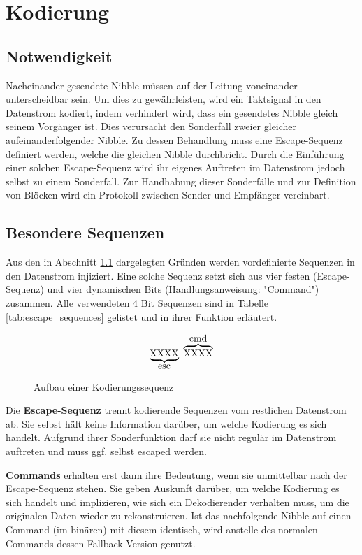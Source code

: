 \chapter{Kodierung}
\section{Notwendigkeit}
\label{sec:notwendigkeit}
Nacheinander gesendete Nibble müssen auf der Leitung voneinander unterscheidbar sein. Um dies zu gewährleisten, wird ein Taktsignal in den Datenstrom kodiert, indem verhindert wird, dass ein gesendetes Nibble gleich seinem Vorgänger ist. Dies verursacht den Sonderfall zweier gleicher aufeinanderfolgender Nibble. Zu dessen Behandlung muss eine Escape-Sequenz definiert werden, welche die gleichen Nibble durchbricht. Durch die Einführung einer solchen Escape-Sequenz wird ihr eigenes Auftreten im Datenstrom jedoch selbst zu einem Sonderfall. Zur Handhabung dieser Sonderfälle und zur Definition von Blöcken wird ein Protokoll zwischen Sender und Empfänger vereinbart.

\section{Besondere Sequenzen}
Aus den in Abschnitt \ref{sec:notwendigkeit} dargelegten Gründen werden vordefinierte Sequenzen in den Datenstrom injiziert. Eine solche Sequenz setzt sich aus vier festen (Escape-Sequenz) und vier dynamischen Bits (Handlungsanweisung: "Command") zusammen. Alle verwendeten 4 Bit Sequenzen sind in Tabelle \ref{tab:escape_sequences} gelistet und in ihrer Funktion erläutert.

\begin{figure}[H]
    \centering
    \[
        \underbrace{\text{XXXX}}_\text{\normalsize esc} \ \overbrace{\text{XXXX}}^\text{\normalsize cmd}
    \]
    \caption{Aufbau einer Kodierungssequenz}
\end{figure}

Die \textbf{Escape-Sequenz} trennt kodierende Sequenzen vom restlichen Datenstrom ab. Sie selbst hält keine Information darüber, um welche Kodierung es sich handelt. Aufgrund ihrer Sonderfunktion darf sie nicht regulär im Datenstrom auftreten und muss ggf. selbst escaped werden.

\textbf{Commands} erhalten erst dann ihre Bedeutung, wenn sie unmittelbar nach der Escape-Sequenz stehen. Sie geben Auskunft darüber, um welche Kodierung es sich handelt und implizieren, wie sich ein Dekodierender verhalten muss, um die originalen Daten wieder zu rekonstruieren. Ist das nachfolgende Nibble auf einen Command (im binären) mit diesem identisch, wird anstelle des normalen Commands dessen Fallback-Version genutzt.

